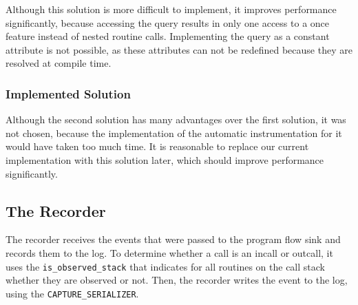 Although this solution is more difficult to implement, it improves performance significantly, because accessing the query results in only one access to a once feature instead of nested routine calls. Implementing the query as a constant attribute is not possible, as these attributes can not be redefined because they are resolved at compile time.

\subsubsection {Implemented Solution}
Although the second solution has many advantages over the first solution, it was not chosen, because the implementation of the automatic instrumentation for it would have taken too much time. It is reasonable to replace our current implementation with this solution later, which should improve performance significantly.


\subsection{The Recorder}
The recorder receives the events that were passed to the program flow sink and records them to the log. To determine whether a call is an incall or outcall, it uses the \texttt{is\_observed\_stack} that indicates for all routines on the call stack whether they are observed or not. Then, the recorder writes the event to the log, using the \texttt{CAPTURE\_SERIALIZER}.
